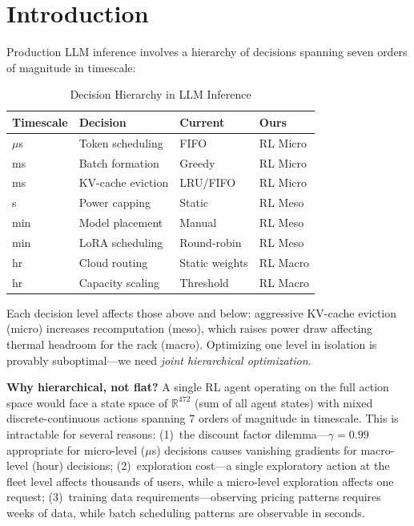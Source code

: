 \documentclass[conference,10pt]{IEEEtran}
\begin{document}
\section{Introduction}
\label{sec:intro}

Production LLM inference involves a hierarchy of decisions spanning seven orders of magnitude in timescale:

\begin{table}[!htbp]
\caption{Decision Hierarchy in LLM Inference}
\label{tab:hierarchy}
\centering\scriptsize
\begin{tabular}{@{}llll@{}}
\toprule
\textbf{Timescale} & \textbf{Decision} & \textbf{Current} & \textbf{Ours} \\
\midrule
$\mu$s & Token scheduling & FIFO & RL Micro \\
ms & Batch formation & Greedy & RL Micro \\
ms & KV-cache eviction & LRU/FIFO & RL Micro \\
s & Power capping & Static & RL Meso \\
min & Model placement & Manual & RL Meso \\
min & LoRA scheduling & Round-robin & RL Meso \\
hr & Cloud routing & Static weights & RL Macro \\
hr & Capacity scaling & Threshold & RL Macro \\
\bottomrule
\end{tabular}
\end{table}

Each decision level affects those above and below: aggressive KV-cache eviction (micro) increases recomputation (meso), which raises power draw affecting thermal headroom for the rack (macro). Optimizing one level in isolation is provably suboptimal---we need \emph{joint hierarchical optimization}.

\textbf{Why hierarchical, not flat?} A single RL agent operating on the full action space would face a state space of $\mathbb{R}^{472}$ (sum of all agent states) with mixed discrete-continuous actions spanning 7 orders of magnitude in timescale. This is intractable for several reasons: (1)~the discount factor dilemma---$\gamma=0.99$ appropriate for micro-level ($\mu$s) decisions causes vanishing gradients for macro-level (hour) decisions; (2)~exploration cost---a single exploratory action at the fleet level affects thousands of users, while a micro-level exploration affects one request; (3)~training data requirements---observing pricing patterns requires weeks of data, while batch scheduling patterns are observable in seconds.
\end{document}
